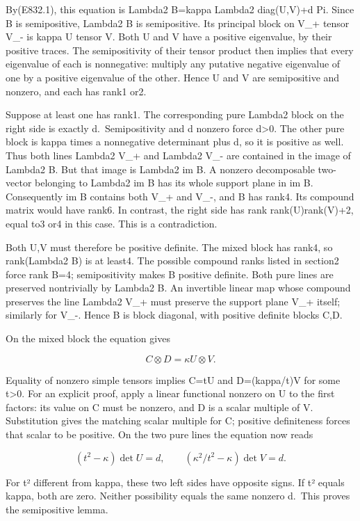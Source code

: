 By(E832.1), this equation is Lambda2 B=kappa Lambda2 diag(U,V)+d Pi.
Since B is semipositive, Lambda2 B is semipositive. Its principal block
on V\_+ tensor V\_- is kappa U tensor V. Both U and V have a positive
eigenvalue, by their positive traces. The semipositivity of their tensor
product then implies that every eigenvalue of each is nonnegative:
multiply any putative negative eigenvalue of one by a positive
eigenvalue of the other. Hence U and V are semipositive and nonzero, and
each has rank1 or2.

Suppose at least one has rank1. The corresponding pure Lambda2 block on
the right side is exactly d.~Semipositivity and d nonzero force
d\textgreater0. The other pure block is kappa times a nonnegative
determinant plus d, so it is positive as well. Thus both lines Lambda2
V\_+ and Lambda2 V\_- are contained in the image of Lambda2 B. But that
image is Lambda2 im B. A nonzero decomposable two-vector belonging to
Lambda2 im B has its whole support plane in im B. Consequently im B
contains both V\_+ and V\_-, and B has rank4. Its compound matrix would
have rank6. In contrast, the right side has rank rank(U)rank(V)+2, equal
to3 or4 in this case. This is a contradiction.

Both U,V must therefore be positive definite. The mixed block has rank4,
so rank(Lambda2 B) is at least4. The possible compound ranks listed in
section2 force rank B=4; semipositivity makes B positive definite. Both
pure lines are preserved nontrivially by Lambda2 B. An invertible linear
map whose compound preserves the line Lambda2 V\_+ must preserve the
support plane V\_+ itself; similarly for V\_-. Hence B is block
diagonal, with positive definite blocks C,D.

On the mixed block the equation gives

\[
 C\otimes D=\kappa U\otimes V.
 \tag{E832.4}
\]

Equality of nonzero simple tensors implies C=tU and D=(kappa/t)V for
some t\textgreater0. For an explicit proof, apply a linear functional
nonzero on U to the first factors: its value on C must be nonzero, and D
is a scalar multiple of V. Substitution gives the matching scalar
multiple for C; positive definiteness forces that scalar to be positive.
On the two pure lines the equation now reads

\[
 (t^2-\kappa)\det U=d,
 \qquad(\kappa^2/t^2-\kappa)\det V=d.
 \tag{E832.5}
\]

For t² different from kappa, these two left sides have opposite signs.
If t² equals kappa, both are zero. Neither possibility equals the same
nonzero d.~This proves the semipositive lemma.

